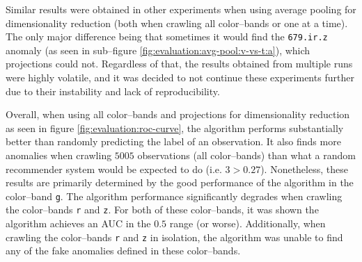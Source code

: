 Similar results were obtained in other experiments when using average pooling for dimensionality reduction (both when crawling all \panstarrs color--bands or one at a time). The only major difference being that sometimes it would find the \texttt{679.ir.z} anomaly (as seen in sub--figure \ref{fig:evaluation:avg-pool:v-vs-t:a}), which projections could not. Regardless of that, the results obtained from multiple runs were highly volatile, and it was decided to not continue these experiments further due to their instability and lack of reproducibility. \newline

Overall, when using all \panstarrs color--bands and projections for dimensionality reduction as seen in figure \ref{fig:evaluation:roc-curve}, the \mlblink algorithm performs substantially better than randomly predicting the label of an observation. It also finds more anomalies when crawling $5005$ observations (all \panstarrs color--bands) than what a random recommender system would be expected to do (i.e. $3 > 0.27$). Nonetheless, these results are primarily determined by the good performance of the \mlblink algorithm in the \panstarrs color--band \texttt{g}. The \mlblink algorithm performance significantly degrades when crawling the \panstarrs color--bands \texttt{r} and \texttt{z}. For both of these color--bands, it was shown the \mlblink algorithm achieves an AUC in the $0.5$ range (or worse). Additionally, when crawling the \panstarrs color--bands \texttt{r} and \texttt{z} in isolation, the \mlblink algorithm was unable to find any of the fake anomalies defined in these color--bands.
